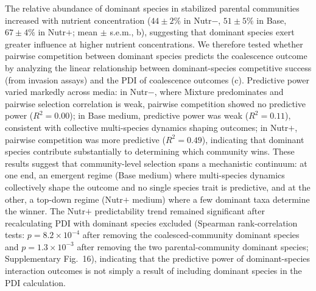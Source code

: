 The relative abundance of dominant species in stabilized parental communities increased with nutrient concentration ($44 \pm 2\%$ in Nutr$-$, $51 \pm 5\%$ in Base, $67 \pm 4\%$ in Nutr$+$; mean $\pm$ s.e.m., b), suggesting that dominant species exert greater influence at higher nutrient concentrations. We therefore tested whether pairwise competition between dominant species predicts the coalescence outcome by analyzing the linear relationship between dominant-species competitive success (from invasion assays) and the PDI of coalescence outcomes (c). Predictive power varied markedly across media: in Nutr$-$, where Mixture predominates and pairwise selection correlation is weak, pairwise competition showed no predictive power ($R^2 = 0.00$); in Base medium, predictive power was weak ($R^2 = 0.11$), consistent with collective multi-species dynamics shaping outcomes; in Nutr$+$, pairwise competition was more predictive ($R^2 = 0.49$), indicating that dominant species contribute substantially to determining which community wins. These results suggest that community-level selection spans a mechanistic continuum: at one end, an emergent regime (Base medium) where multi-species dynamics collectively shape the outcome and no single species trait is predictive, and at the other, a top-down regime (Nutr$+$ medium) where a few dominant taxa determine the winner. The Nutr$+$ predictability trend remained significant after recalculating PDI with dominant species excluded (Spearman rank-correlation tests: $p = 8.2 \times 10^{-4}$ after removing the coalesced-community dominant species and $p = 1.3 \times 10^{-3}$ after removing the two parental-community dominant species; Supplementary Fig.~16), indicating that the predictive power of dominant-species interaction outcomes is not simply a result of including dominant species in the PDI calculation.


